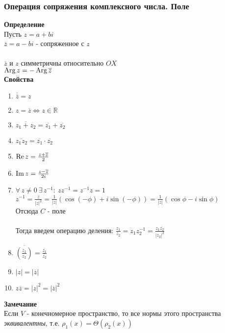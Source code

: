 \documentclass[12pt]{article}
\begin{document}
\subsubsection{Операция сопряжения комплексного числа. Поле}
\textbf{Определение}\\
Пусть $z=a+bi$\\
$\overline{z}=a-bi$ - сопряженное с $z$\\\\
$\overline{z}$ и $z$ симметричны относительно $OX$\\
$\operatorname{Arg} z = - \operatorname{Arg} \overline{z}$\\
\textbf{Свойства}
\begin{enumerate}
    \item $\overline{\overline{z}} = z$
    \item $z = \overline{z} \Leftrightarrow z \in \mathbb{R}$
    \item $\overline{z_1+z_2} = \overline{z_1}+\overline{z_2}$
    \item $\overline{z_1z_2} = \overline{z_1}\cdot\overline{z_2}$
    \item $\operatorname{Re} z = \frac{z+\overline{z}}{2}$
    \item $\operatorname{Im} z = \frac{z-\overline{z}}{2i}$
    \item $\forall\,z\neq 0\ \exists\,z^{-1}:\ zz^{-1}=z^{-1}z=1$\\
    $z^{-1} = \frac{\overline{z}}{|z|^2} = \frac1{|z|}(\cos(-\phi)+i\sin(-\phi)) = \frac1{|z|}(\cos\phi-i\sin\phi)$\\
    Отсюда $\mathbb{}{C}$ - поле\\\\
    Тогда введем операцию деления: $\frac{z_1}{z_2} = z_1z_2^{-1} = \frac{z_1\overline{z_2}}{|z_2|^2}$
    \item $\overline{(\frac{z_1}{z_2})} = \frac{\overline{z_1}}{\overline{z_2}}$
    \item $|z|=|\overline{z}|$
    \item $z\overline{z} = |z|^2=|\overline{z}|^2$
\end{enumerate}
\textbf{Замечание}\\
Если $V$ - конечномерное пространство, то все нормы этого пространства \textit{эквивалентны}, т.е. $\rho_1(x) = \Theta(\rho_2(x))$
\end{document}
